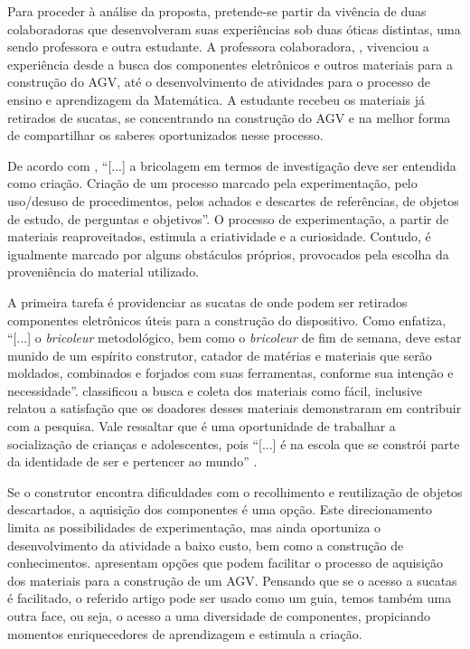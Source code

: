 \documentclass[portuguese]{textolivre}
\begin{document}
Para proceder à análise da proposta, pretende-se partir da vivência de duas colaboradoras que desenvolveram suas experiências sob duas óticas distintas, uma sendo professora e outra estudante. A professora colaboradora, \textcite{AlvesMonica2022}, vivenciou a experiência desde a busca dos componentes eletrônicos e outros materiais para a construção do AGV, até o desenvolvimento de atividades para o processo de ensino e aprendizagem da Matemática. A estudante recebeu os materiais já retirados de sucatas, se concentrando na construção do AGV e na melhor forma de compartilhar os saberes oportunizados nesse processo.

De acordo com \textcite[p. 32]{Nunes2014}, “[...] a bricolagem em termos de investigação deve ser entendida como criação. Criação de um processo marcado pela experimentação, pelo uso/desuso de procedimentos, pelos achados e descartes de referências, de objetos de estudo, de perguntas e objetivos”. O processo de experimentação, a partir de materiais reaproveitados, estimula a criatividade e a curiosidade. Contudo, é igualmente marcado por alguns obstáculos próprios, provocados pela escolha da proveniência do material utilizado.

A primeira tarefa é providenciar as sucatas de onde podem ser retirados componentes eletrônicos úteis para a construção do dispositivo. Como \textcite[p. 32]{Nunes2014} enfatiza, “[...] o \emph{bricoleur} metodológico, bem como o \emph{bricoleur} de fim de semana, deve estar munido de um espírito construtor, catador de matérias e materiais que serão moldados, combinados e forjados com suas ferramentas, conforme sua intenção e necessidade”. \textcite{AlvesMonica2022} classificou a busca e coleta dos materiais como fácil, inclusive relatou a satisfação que os doadores desses materiais demonstraram em contribuir com a pesquisa. Vale ressaltar que é uma oportunidade de trabalhar a socialização de crianças e adolescentes, pois “[...] é na escola que se constrói parte da identidade de ser e pertencer ao mundo” \cite[p. 2]{BorsaJuliane2007}.

Se o construtor encontra dificuldades com o recolhimento e reutilização de objetos descartados, a aquisição dos componentes é uma opção. Este direcionamento limita as possibilidades de experimentação, mas ainda oportuniza o desenvolvimento da atividade a baixo custo, bem como a construção de conhecimentos. \textcite{Guimaraes2020} apresentam opções que podem facilitar o processo de aquisição dos materiais para a construção de um AGV. Pensando que se o acesso a sucatas é facilitado, o referido artigo pode ser usado como um guia, temos também uma outra face, ou seja, o acesso a uma diversidade de componentes, propiciando momentos enriquecedores de aprendizagem e estimula a criação.
\end{document}
